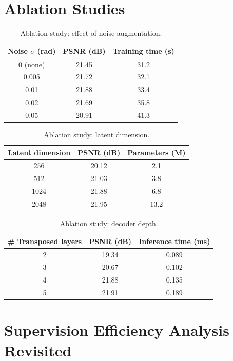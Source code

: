 \documentclass[12pt,a4paper,oneside]{report}
\begin{document}
\section{Ablation Studies}

\begin{table}[H]
\centering
\caption{Ablation study: effect of noise augmentation.}
\label{tab:ablation_noise}
\begin{tabular}{ccc}
\toprule
Noise $\sigma$ (rad) & PSNR (dB) & Training time (s) \\
\midrule
0 (none) & 21.45 & 31.2 \\
0.005 & 21.72 & 32.1 \\
0.01 & 21.88 & 33.4 \\
0.02 & 21.69 & 35.8 \\
0.05 & 20.91 & 41.3 \\
\bottomrule
\end{tabular}
\end{table}

\begin{table}[H]
\centering
\caption{Ablation study: latent dimension.}
\label{tab:ablation_latent}
\begin{tabular}{ccc}
\toprule
Latent dimension & PSNR (dB) & Parameters (M) \\
\midrule
256 & 20.12 & 2.1 \\
512 & 21.03 & 3.8 \\
1024 & 21.88 & 6.8 \\
2048 & 21.95 & 13.2 \\
\bottomrule
\end{tabular}
\end{table}

\begin{table}[H]
\centering
\caption{Ablation study: decoder depth.}
\label{tab:ablation_depth}
\begin{tabular}{ccc}
\toprule
\# Transposed layers & PSNR (dB) & Inference time (ms) \\
\midrule
2 & 19.34 & 0.089 \\
3 & 20.67 & 0.102 \\
4 & 21.88 & 0.135 \\
5 & 21.91 & 0.189 \\
\bottomrule
\end{tabular}
\end{table}

\section{Supervision Efficiency Analysis Revisited}
\end{document}
